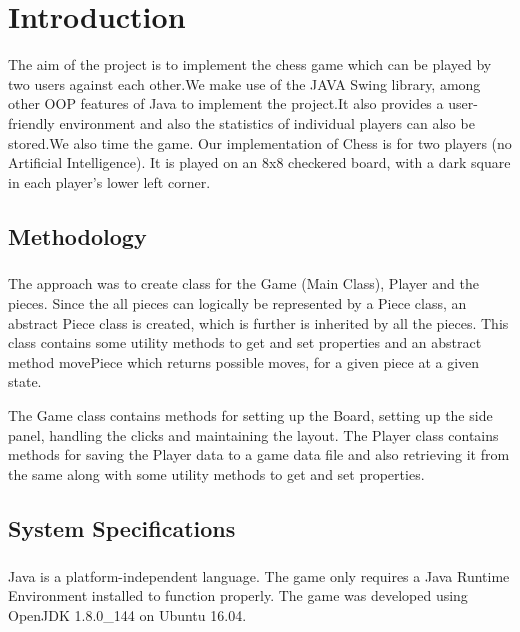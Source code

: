 \chapter{Introduction}

The aim of the project is to implement the chess game which can be played by two users against each other.We make use of the JAVA Swing library, among other OOP features of Java to implement the project.It also provides a user-friendly environment and also the statistics of individual players can also be stored.We also time the game. Our implementation of Chess is for two players (no Artificial Intelligence). It is played on an 8x8 checkered board, with a dark square in each player’s lower left corner.

\section{Methodology}
\paragraph{}
The approach was to create class for the Game (Main Class), Player and the pieces. Since the all pieces can logically be represented by a Piece class, an abstract Piece class is created, which is further is inherited by all the pieces. This class contains some utility methods to get and set properties and an abstract method movePiece which returns possible moves, for a given piece at a given state. 

The Game class contains methods for setting up the Board, setting up the side panel, handling the clicks and maintaining the layout. The Player class contains methods for saving the Player data to a game data file and also retrieving it from the same along with some utility methods to get and set properties.

\section{System Specifications}
\paragraph{}
Java is a platform-independent language. The game only requires a Java Runtime Environment installed to function properly. The game was developed using OpenJDK 1.8.0\_144 on Ubuntu 16.04.